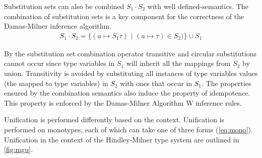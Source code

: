 \documentclass[11pt,oneside,a4paper]{report}
\begin{document}
Substitution sets can also be combined $S_1 \cdot S_2$ with well defined-semantics.
The combination of substitution sets is a key component for the correctness of the Damas-Milner inference algorithm.
\begin{align}
    S_1 \cdot S_2 = \{ (a \mapsto S_1\tau) \,\,|\,\, (a \mapsto \tau) \in S_2) \} \cup S_1
    \label{eq:combination}
\end{align}
\begin{remark}
By the substitution set combination operator transitive and circular substitutions cannot occur since type variables in $S_1$ will inherit all the mappings from $S_2$ by union.
Transitivity is avoided by substituting all instances of type variables values (the mapped to type variables) in $S_2$ with ones that occur in $S_1$.
The properties ensured by the combination semantics also induce the property of idempotence.
This property is enforced by the Damas-Milner Algorithm W inference rules.
\end{remark}
Unification is performed differently based on the context.
Unification is performed on monotypes, each of which can take one of three forms (\autoref{eq:mono}).
Unification in the context of the Hindley-Milner type system are outlined in \autoref{fig:mgu}.
\end{document}
